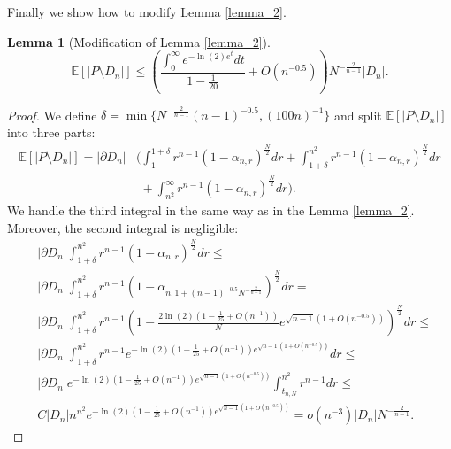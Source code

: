 \documentclass[10pt, twoside, leqno]{article}
\newtheorem{lemma}[thm]{Lemma}
\theoremstyle{definition}
\numberwithin{equation}{section}
\newcommand{\E}{{\mathbb{E}}}
\newcommand{\NN}{N^{-\frac 2{n-1} }}
\begin{document}
Finally we show how to modify Lemma \ref{lemma_2}.
\begin{lemma}[Modification of Lemma \ref{lemma_2}]
	\begin{equation*}
	\E[|P \setminus D_n|]  \leq \left(\frac{\int_{0}^{\infty}e^{-\ln(2)e^{t}}dt}{1-\frac{1}{20}}+O\left(n^{-0.5}\right)\right)N^{-\frac{2}{n-1}}|D_n|.
	\end{equation*}
\end{lemma}
\begin{proof}
	We define $ \delta = \min\{\NN(n-1)^{-0.5},(100n)^{-1}\}$ and split $\E[|P \setminus D_n|]  $ into three parts:
	\begin{equation*}
\begin{aligned}
\E[|P\setminus D_n|]=|\partial D_{n}| & \bigg(\int_{1}^{1+\delta}r^{n-1}\left(1-\alpha_{n,r}\right)^{\frac{N}{2}}dr+\int_{1+\delta}^{n^{2}}r^{n-1}\left(1-\alpha_{n,r}\right)^{\frac{N}{2}}dr\\
& \,\,+\int_{n^{2}}^{\infty}r^{n-1}\left(1-\alpha_{n,r}\right)^{\frac{N}{2}}dr\bigg).
\end{aligned}
	\end{equation*}
	We handle the third integral in the same way as in the Lemma \ref{lemma_2}. Moreover, the second integral is negligible:
	\begin{equation*}
\begin{aligned} & |\partial D_{n}|\int_{1+\delta}^{n^{2}}r^{n-1}\left(1-\alpha_{n,r}\right)^{\frac{N}{2}}dr\leq\\
& |\partial D_{n}|\int_{1+\delta}^{n^{2}}r^{n-1}\left(1-\alpha_{n,1+\left(n-1\right)^{-0.5}N^{-\frac{2}{n-1}}}\right)^{\frac{N}{2}}dr=\\
& |\partial D_{n}|\int_{1+\delta}^{n^{2}}r^{n-1}\left(1-\frac{2\ln(2)\left(1-\frac{1}{25}+O\left(n^{-1}\right)\right)}{N}e^{\sqrt{n-1}\left(1+O\left(n^{-0.5}\right)\right)}\right)^{\frac{N}{2}}dr\leq\\
& |\partial D_{n}|\int_{1+\delta}^{n^{2}}r^{n-1}e^{-\ln(2)\left(1-\frac{1}{25}+O\left(n^{-1}\right)\right)e^{\sqrt{n-1}\left(1+O\left(n^{-0.5}\right)\right)}}dr\leq\\
& |\partial D_{n}|e^{-\ln(2)\left(1-\frac{1}{25}+O\left(n^{-1}\right)\right)e^{\sqrt{n-1}\left(1+O\left(n^{-0.5}\right)\right)}}\int_{t_{n,N}}^{n^{2}}r^{n-1}dr\leq\\
& C|D_{n}|n^{n^{2}}e^{-\ln(2)\left(1-\frac{1}{25}+O\left(n^{-1}\right)\right)e^{\sqrt{n-1}\left(1+O\left(n^{-0.5}\right)\right)}}=o(n^{-3})|D_{n}|\NN.
\end{aligned}
	\end{equation*}

\end{proof}
\end{document}
